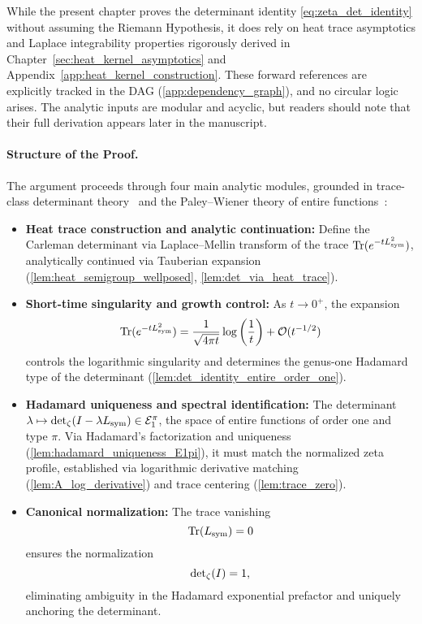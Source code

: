 \begin{remark}
While the present chapter proves the determinant identity \eqref{eq:zeta_det_identity} without assuming the Riemann Hypothesis, it does rely on heat trace asymptotics and Laplace integrability properties rigorously derived in Chapter~\ref{sec:heat_kernel_asymptotics} and Appendix~\ref{app:heat_kernel_construction}. These forward references are explicitly tracked in the DAG (\cref{app:dependency_graph}), and no circular logic arises. The analytic inputs are modular and acyclic, but readers should note that their full derivation appears later in the manuscript.
\end{remark}

\medskip

\paragraph{Structure of the Proof.}
The argument proceeds through four main analytic modules, grounded in trace-class determinant theory~\cite[Ch.~4]{Simon2005TraceIdeals} and the Paley--Wiener theory of entire functions~\cite[Ch.~9]{Levin1996EntireLectures}:

\begin{itemize}
  \item \textbf{Heat trace construction and analytic continuation:} Define the Carleman determinant via Laplace--Mellin transform of the trace \( \operatorname{Tr}(e^{-t L_{\mathrm{sym}}^2}) \), analytically continued via Tauberian expansion (\cref{lem:heat_semigroup_wellposed}, \cref{lem:det_via_heat_trace}).

  \item \textbf{Short-time singularity and growth control:} As \( t \to 0^+ \), the expansion
  \[
  \operatorname{Tr}(e^{-t L_{\mathrm{sym}}^2}) = \frac{1}{\sqrt{4\pi t}} \log\left(\frac{1}{t}\right) + \mathcal{O}(t^{-1/2})
  \]
  controls the logarithmic singularity and determines the genus-one Hadamard type of the determinant (\cref{lem:det_identity_entire_order_one}).

  \item \textbf{Hadamard uniqueness and spectral identification:} The determinant \( \lambda \mapsto \det\nolimits_{\zeta}(I - \lambda L_{\mathrm{sym}}) \in \mathcal{E}_1^\pi \), the space of entire functions of order one and type \( \pi \). Via Hadamard's factorization and uniqueness (\cref{lem:hadamard_uniqueness_E1pi}), it must match the normalized zeta profile, established via logarithmic derivative matching (\cref{lem:A_log_derivative}) and trace centering (\cref{lem:trace_zero}).

  \item \textbf{Canonical normalization:} The trace vanishing
  \[
  \operatorname{Tr}(L_{\mathrm{sym}}) = 0
  \]
  ensures the normalization
  \[
  \det\nolimits_{\zeta}(I) = 1,
  \]
  eliminating ambiguity in the Hadamard exponential prefactor and uniquely anchoring the determinant.
\end{itemize}

